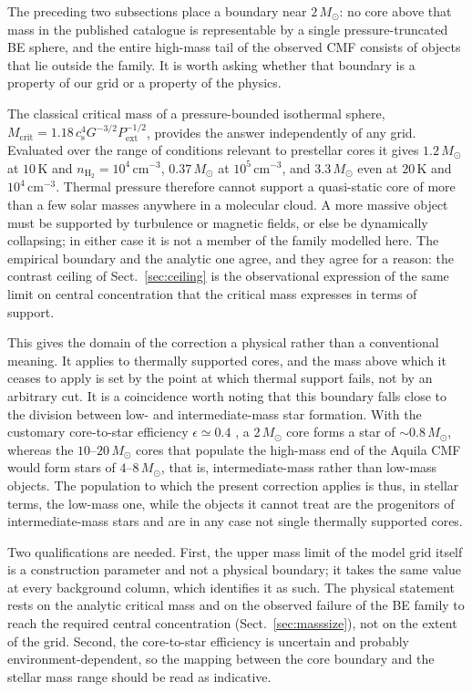 \documentclass[11pt,a4paper]{article}
\newcommand{\msun}{M_{\odot}}
\newcommand{\cs}{c_{\mathrm{s}}}
\begin{document}
The preceding two subsections place a boundary near $2\,\msun$: no core above
that mass in the published catalogue is representable by a single
pressure-truncated BE sphere, and the entire high-mass tail of the observed
CMF consists of objects that lie outside the family. It is worth asking
whether that boundary is a property of our grid or a property of the physics.

The classical critical mass of a pressure-bounded isothermal sphere,
$M_{\mathrm{crit}}=1.18\,\cs^{4}G^{-3/2}P_{\mathrm{ext}}^{-1/2}$, provides the
answer independently of any grid. Evaluated over the range of conditions
relevant to prestellar cores it gives $1.2\,\msun$ at $10$\,K and
$n_{\mathrm{H_2}}=10^{4}\,\mathrm{cm^{-3}}$, $0.37\,\msun$ at
$10^{5}\,\mathrm{cm^{-3}}$, and $3.3\,\msun$ even at $20$\,K and
$10^{4}\,\mathrm{cm^{-3}}$. Thermal pressure therefore cannot support a
quasi-static core of more than a few solar masses anywhere in a molecular
cloud. A more massive object must be supported by turbulence or magnetic
fields, or else be dynamically collapsing; in either case it is not a member
of the family modelled here. The empirical boundary and the analytic one
agree, and they agree for a reason: the contrast ceiling of
Sect.~\ref{sec:ceiling} is the observational expression of the same limit on
central concentration that the critical mass expresses in terms of support.

This gives the domain of the correction a physical rather than a conventional
meaning. It applies to thermally supported cores, and the mass above which it
ceases to apply is set by the point at which thermal support fails, not by an
arbitrary cut. It is a coincidence worth noting that this boundary falls close
to the division between low- and intermediate-mass star formation. With the
customary core-to-star efficiency $\epsilon\simeq0.4$
\citep{Andre+2010,Konyves+2015}, a $2\,\msun$ core forms a star of
$\sim$$0.8\,\msun$, whereas the $10$--$20\,\msun$ cores that populate the
high-mass end of the Aquila CMF would form stars of $4$--$8\,\msun$, that is,
intermediate-mass rather than low-mass objects. The population to which the
present correction applies is thus, in stellar terms, the low-mass one, while
the objects it cannot treat are the progenitors of intermediate-mass stars
and are in any case not single thermally supported cores.

Two qualifications are needed. First, the upper mass limit of the model grid
itself is a construction parameter and not a physical boundary; it takes the
same value at every background column, which identifies it as such. The
physical statement rests on the analytic critical mass and on the observed
failure of the BE family to reach the required central concentration
(Sect.~\ref{sec:masssize}), not on the extent of the grid. Second, the
core-to-star efficiency is uncertain and probably environment-dependent, so
the mapping between the core boundary and the stellar mass range should be
read as indicative.
\end{document}
